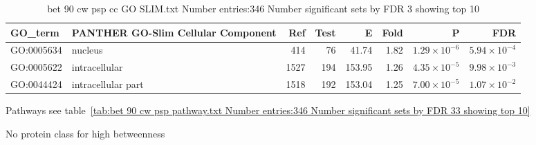 \begin{table}[ht]
\centering
\begin{tabular}{llrrrrrr}
  \hline
GO\_term & PANTHER GO-Slim Cellular Component & Ref & Test & E & Fold & P & FDR \\ 
  \hline
GO:0005634 & nucleus  & 414 & 76 & 41.74 & 1.82 & $1.29 \times 10^{-6}$ & $5.94 \times 10^{-4}$ \\ 
  GO:0005622 & intracellular  & 1527 & 194 & 153.95 & 1.26 & $4.35 \times 10^{-5}$ & $9.98 \times 10^{-3}$ \\ 
  GO:0044424 & intracellular part  & 1518 & 192 & 153.04 & 1.25 & $7.00 \times 10^{-5}$ & $1.07 \times 10^{-2}$ \\ 
  \hline
\end{tabular}
\caption{bet 90 cw psp cc GO SLIM.txt Number entries:346 Number significant sets by FDR 3 showing top 10} 
\label{tab:bet 90 cw psp cc GO SLIM.txt Number entries:346 Number significant sets by FDR 3 showing top 10}
\end{table}

Pathways see table~\ref{tab:bet 90 cw psp pathway.txt Number entries:346 Number significant sets by FDR 33 showing top 10}

No protein class for high betweenness




